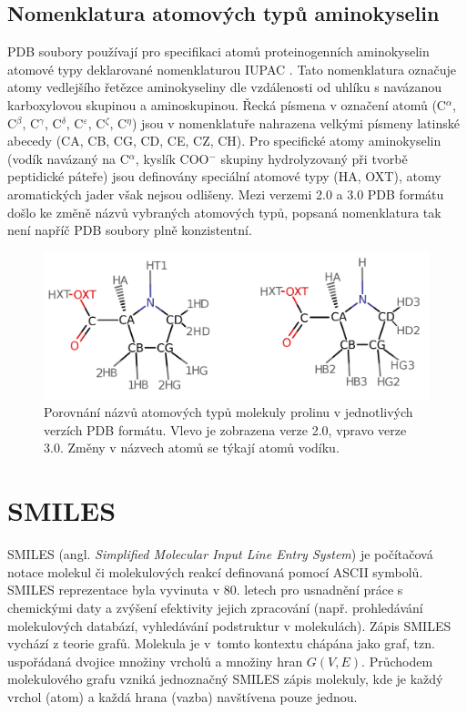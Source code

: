 \subsection{Nomenklatura atomových typů aminokyselin}
PDB soubory používají pro specifikaci atomů proteinogenních aminokyselin atomové typy deklarované nomenklaturou IUPAC \cite{AA_nomenclature}. Tato nomenklatura označuje atomy vedlejšího řetězce aminokyseliny dle vzdálenosti od uhlíku s navázanou karboxylovou skupinou a aminoskupinou. Řecká písmena v označení atomů (C$^\alpha$, C$^\beta$, C$^\gamma$, C$^\delta$, C$^\varepsilon$, C$^\zeta$, C$^\eta$) jsou v nomenklatuře nahrazena velkými písmeny latinské abecedy (CA, CB, CG, CD, CE, CZ, CH). Pro specifické atomy aminokyselin (vodík navázaný na C$^\alpha$, kyslík COO$^-$ skupiny hydrolyzovaný při tvorbě peptidické páteře) jsou definovány speciální atomové typy (HA, OXT), atomy aromatických jader však nejsou odlišeny. Mezi verzemi 2.0 a 3.0 PDB formátu došlo ke změně názvů vybraných atomových typů, popsaná nomenklatura tak není napříč PDB soubory plně konzistentní. 

\begin{figure}[h]
\begin{center}
\includegraphics[width=12cm]{pictures/prolin_merged.png}
\caption{Porovnání názvů atomových typů molekuly prolinu v jednotlivých verzích PDB formátu. Vlevo je zobrazena verze 2.0, vpravo verze 3.0. Změny v názvech atomů se týkají atomů vodíku.}
\end{center}
\end{figure}

\section{SMILES}
SMILES \cite{Weininger, Bunin, Leach_chemo} (angl. \textit{Simplified Molecular Input Line Entry System}) je počítačová notace molekul či molekulových reakcí definovaná pomocí ASCII symbolů. SMILES reprezentace byla vyvinuta v 80. letech pro usnadnění práce s chemickými daty  a zvýšení efektivity jejich zpracování (např. prohledávání molekulových databází, vyhledávání podstruktur v molekulách). Zápis SMILES vychází z teorie grafů. Molekula je v~tomto kontextu chápána jako graf, tzn. uspořádaná dvojice množiny vrcholů a množiny hran $G(V,E)$. Průchodem molekulového grafu vzniká jednoznačný SMILES zápis molekuly, kde je každý vrchol (atom) a každá hrana (vazba) navštívena pouze jednou.

